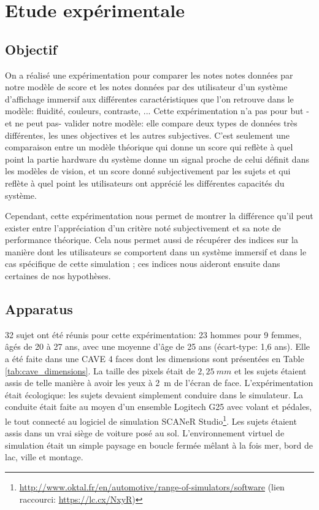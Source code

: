 \chapter{Etude expérimentale}
	\section{Objectif}
		\par On a réalisé une expérimentation pour comparer les notes notes données par notre modèle de score et les notes données par des utilisateur d'un système d'affichage immersif aux différentes caractéristiques que l'on retrouve dans le modèle: fluidité, couleurs, contraste, ... Cette expérimentation n'a pas pour but -et ne peut pas- valider notre modèle: elle compare deux types de données très différentes, les unes objectives et les autres subjectives. C'est seulement une comparaison entre un modèle théorique qui donne un score qui reflète à quel point la partie hardware du système donne un signal proche de celui définit dans les modèles de vision, et un score donné subjectivement par les sujets et qui reflète à quel point les utilisateurs ont apprécié les différentes capacités du système.
		
		\par Cependant, cette expérimentation nous permet de montrer la différence qu'il peut exister entre l'appréciation d'un critère noté subjectivement et sa note de performance théorique. Cela nous permet aussi de récupérer des indices sur la manière dont les utilisateurs se comportent dans un système immersif et dans le cas spécifique de cette simulation ; ces indices nous aideront ensuite dans certaines de nos hypothèses.
		
	\section{Apparatus}
	\par 32 sujet ont été réunis pour cette expérimentation: 23 hommes pour 9 femmes, âgés de 20 à 27 ans, avec une moyenne d'âge de 25 ans (écart-type: 1,6 ans). Elle a été faite dans une CAVE 4 faces dont les dimensions sont présentées en Table \ref{tab:cave_dimensions}. La taille des pixels était de $2,25~mm$ et les sujets étaient assis de telle manière à avoir les yeux à 2~m de l'écran de face. L'expérimentation était écologique: les sujets devaient simplement conduire dans le simulateur. La conduite était faite au moyen d'un ensemble Logitech G25 avec volant et pédales, le tout connecté au logiciel de simulation SCANeR Studio\footnote{\url{http://www.oktal.fr/en/automotive/range-of-simulators/software} (lien raccourci: \url{https://lc.cx/NxyR})}. Les sujets étaient assis dans un vrai siège de voiture posé au sol. L'environnement virtuel de simulation était un simple paysage en boucle fermée mêlant à la fois mer, bord de lac, ville et montage.
	 
